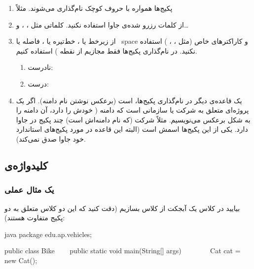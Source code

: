 \begin{enumerate}
\def\labelenumi{\arabic{enumi}.}
\tightlist
\item
  پکیج‌ها همواره با حروف کوچک نام‌گذاری می‌شوند. مثلاً
\item
  از کلمات رزرو شده‌ی جاوا استفاده نکنید. کلماتی مثل 
  ،  ،  و\ldots{}
\item
  از زیرخط یا  \lr{\texttt{\_}} ، خط‌تیره یا 
  \lr{\texttt{-}} ، فاصله یا ~space و کاراکترهای خاص (مثل
   ، \lr{\texttt{\$}} ، \lr{\texttt{\&}}) استفاده نکنید.
  در نام‌گذاری پکیج‌ها فقط مجازیم از  نقطه  )
  استفاده کنیم.

  \begin{enumerate}
  \def\labelenumii{\arabic{enumii}.}
  \tightlist
  \item
    نادرست: 
  \item
    درست: 
  \end{enumerate}
\item
  یک قاعده‌ی دیگر در نام‌گذاری پکیج‌ها،  است (برعکس
  نوشتن نام دامنه). اگر یک پروژه‌ای متعلق به شرکت یا سازمانی است که دامنه
  (  خودش را دارد، آن دامنه را به شکل برعکس می‌نویسیم. مثلاً
  شرکت  (که نام دامنه‌اش  است) چند
  پکیج در جاوا دارد. یکی از این پکیج‌ها اسمش
   است (البته این قاعده در مورد
  پکیج‌های استاندارد خود جاوا صدق نمی‌کند).
\end{enumerate}

\subsection{کلیدواژه‌ی }

\subsubsection{یک مثال عملی}

بیایید در کلاس  یک آبجکت از کلاس 
بسازیم (دقت کنید که این دو کلاس متعلق به دو پکیج متفاوت هستند):

\begin{codebox}{java}
package edu.ap.vehicles;

public class Bike {
    public static void main(String[] args) {  
        Cat cat = new Cat();  
    }  
}
\end{codebox}


